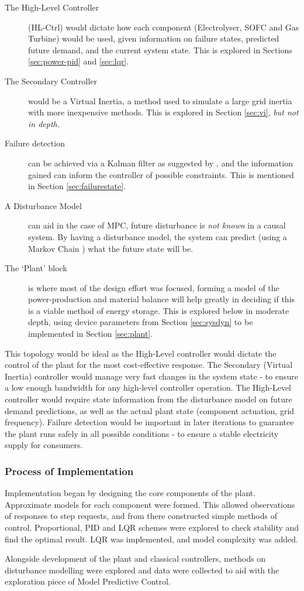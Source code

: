 \begin{description}
        \item[The High-Level Controller] (HL-Ctrl) would dictate how each component (Electrolyser, SOFC and Gas Turbine) would be used, given information on failure states, predicted future demand, and the current system state. This is explored in Sections \ref{sec:power-pid} and \ref{sec:lqr}.
        \item[The Secondary Controller] would be a Virtual Inertia, a method used to simulate a large grid inertia with more inexpensive methods. {This is explored in Section \ref{sec:vi}, \emph{but not in depth.}}
        \item[Failure detection] can be achieved via a Kalman filter as suggested by \cite{power:kalman}, and the information gained can inform the controller of possible constraints. {This is mentioned in Section \ref{sec:failurestate}.}
        \item[A Disturbance Model] can aid in the case of MPC, future disturbance is \emph{not known} in a causal system. By having a disturbance model, the system can predict (using a Markov Chain \cite{power:markovP}) what the future state will be.
        \item[The `Plant' block] is where most of the design effort was focused, forming a model of the power-production and material balance will help greatly in deciding if this is a viable method of energy storage. {This is explored below in moderate depth, using device parameters from Section \ref{sec:sysdyn} to be implemented in Section \ref{sec:plant}.}
\end{description}

This topology would be ideal as the High-Level controller would dictate the control of the plant for the most cost-effective response.
The Secondary (Virtual Inertia) controller would manage very fast changes in the system state - to ensure a low enough bandwidth for any high-level controller operation.
The High-Level controller would require state information from the disturbance model on future demand predictions, as well as the actual plant state (component actuation, grid frequency).
Failure detection would be important in later iterations to guarantee the plant runs safely in all possible conditions - to ensure a stable electricity supply for consumers.

\subsubsection{Process of Implementation}

Implementation began by designing the core components of the plant.
Approximate models for each component were formed.
This allowed observations of responses to step requests, and from there constructed simple methods of control.
Proportional, PID and LQR schemes were explored to check stability and find the optimal result.
LQR was implemented, and model complexity was added.

Alongside development of the plant and classical controllers, methods on disturbance modelling were explored and data were collected to aid with the exploration piece of Model Predictive Control.

